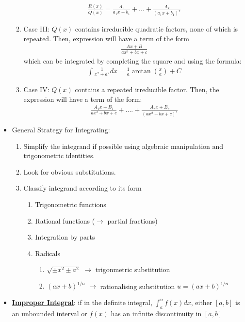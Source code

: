 \documentclass[11pt]{article}
\newcommand{\dfn}[1]{\underline{\textbf{#1}}}
\begin{document}
\begin{itemize}[noitemsep]
\begin{enumerate}[noitemsep]
		\begin{align}
			\frac{R(x)}{Q(x)} = \frac{A_1}{a_1 x + b_1}	 + ... + \frac{A_k}{(a_1 x + b_1)^r}
		\end{align}
		\item Case III: $Q(x)$ contains irreducible quadratic factors, none of which is repeated. Then, expression will have a term of the form
		\begin{align}
			\frac{Ax + B}{ax^2 + bx + c}	
		\end{align}
		which can be integrated by completing the square and using the formula: 
	\begin{align}
		\int \frac{1}{x^2 + a^2} dx = \frac{1}{a} \arctan \left( \frac{x}{a} \right) + C	
	\end{align}
	\item Case IV: $Q(x)$ contains a repeated irreducible factor. Then, the expression will have a term of the form: 
	\begin{align}
		\frac{A_1 x + B_1}{ax^2 + bx + c}	+ .... + \frac{
		A_r x + B_r}{(ax^2 + bx + c)^r}
	\end{align}
	\end{enumerate}
	\item General Strategy for Integrating: 
	\begin{enumerate}[noitemsep]
		\item Simplify the integrand if possible using algebraic manipulation and trigonometric identities. 
		\item Look for obvious substitutions. 
		\item Classify integrand according to its form
		\begin{enumerate}[noitemsep]
			\item Trigonometric functions
			\item Rational functions ($\rightarrow$ partial fractions) 
			\item Integration by parts
			\item Radicals
			\begin{enumerate}[noitemsep]
				\item $\sqrt{ \pm x^2 \pm a^2}$ $\rightarrow$ trigonmetric substitution 
				\item $(ax+b)^{1/n}$ $\rightarrow$ rationalising substitution $u = (ax+b)^{1/n}$
			\end{enumerate}
		\end{enumerate}
	\end{enumerate}
	\item \dfn{Improper Integral}: if in the definite integral, $\int_a^n f(x) dx$, either $[a,b]$ is an unbounded interval or $f(x)$ has an infinite discontinuity in $[a,b]$
\end{itemize}
\end{document}
